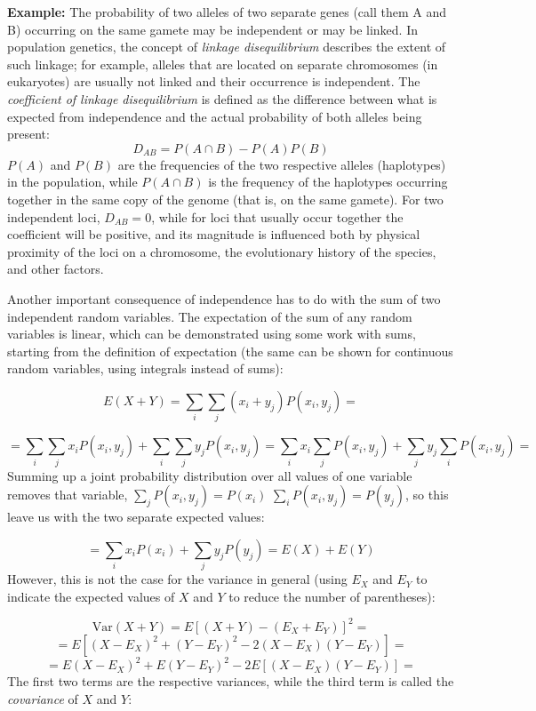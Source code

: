 \documentclass[
  letterpaper,
  DIV=11,
  numbers=noendperiod]{scrreprt}
\begin{document}
\textbf{Example:} The probability of two alleles of two separate genes
(call them A and B) occurring on the same gamete may be independent or
may be linked. In population genetics, the concept of \emph{linkage
disequilibrium} describes the extent of such linkage; for example,
alleles that are located on separate chromosomes (in eukaryotes) are
usually not linked and their occurrence is independent. The
\emph{coefficient of linkage disequilibrium} is defined as the
difference between what is expected from independence and the actual
probability of both alleles being present:
\[D_{AB} = P(A \cap B) - P(A)P(B) \] \(P(A)\) and \(P(B)\) are the
frequencies of the two respective alleles (haplotypes) in the
population, while \(P(A \cap B)\) is the frequency of the haplotypes
occurring together in the same copy of the genome (that is, on the same
gamete). For two independent loci, \(D_{AB} = 0\), while for loci that
usually occur together the coefficient will be positive, and its
magnitude is influenced both by physical proximity of the loci on a
chromosome, the evolutionary history of the species, and other factors.

Another important consequence of independence has to do with the sum of
two independent random variables. The expectation of the sum of any
random variables is linear, which can be demonstrated using some work
with sums, starting from the definition of expectation (the same can be
shown for continuous random variables, using integrals instead of sums):

\[E(X + Y) = \sum_i \sum_j (x_i + y_j) P(x_i, y_j) =\]

\[= \sum_i \sum_j x_iP(x_i, y_j) + \sum_i \sum_j y_j P(x_i, y_j) = \sum_i x_i \sum_j P(x_i, y_j) + \sum_j y_j \sum_i  P(x_i, y_j) = \]
Summing up a joint probability distribution over all values of one
variable removes that variable, \(\sum_j P(x_i, y_j) = P(x_i)\)
\(\sum_i P(x_i, y_j) = P(y_j)\), so this leave us with the two separate
expected values:

\[= \sum_i x_i P(x_i) + \sum_j y_j P(y_j) = E(X) + E(Y)\] However, this
is not the case for the variance in general (using \(E_X\) and \(E_Y\)
to indicate the expected values of \(X\) and \(Y\) to reduce the number
of parentheses):

\[\text{Var}(X+Y) = E \left[ (X+Y)-(E_X+E_Y) \right]^2 = \]
\[=E[ (X-E_X)^2 +(Y-E_Y)^2 - 2(X-E_X)(Y-E_Y)] =  \]
\[=E (X-E_X)^2 +  E(Y-E_Y)^2 - 2 E[(X-E_X)(Y-E_Y)]  = \] The first two
terms are the respective variances, while the third term is called the
\emph{covariance} of \(X\) and \(Y\):
\end{document}
